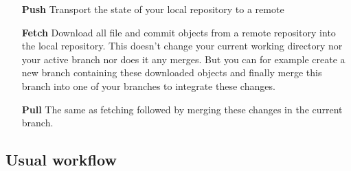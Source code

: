 \documentclass[a4paper,10pt]{scrartcl}
\begin{document}
\begin{itemize}
  \item[\textbf{Push}] Transport the state of your local repository to a remote
  \item[\textbf{Fetch}] Download all file and commit objects from a remote repository into the local repository. This doesn't change your current working directory nor your active branch nor does it any merges. But you can for example create a new branch containing these downloaded objects and finally merge this branch into one of your branches to integrate these changes.
  \item[\textbf{Pull}] The same as fetching followed by merging these changes in the current branch.
\end{itemize}
\subsection*{Usual workflow}
\end{document}
